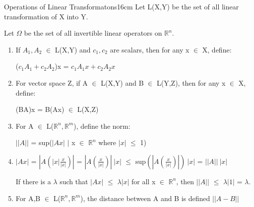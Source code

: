     \begin{definition}{Operations of Linear Transformatons}{16cm}
        Let L(X,Y) be the set of all linear transformation
        of X into Y.

        Let $\Omega$ be the set of all invertible linear operators
        on $\mathbb{R}^n$.

        \begin{enumerate}[label=(\alph*), leftmargin=0.2cm, itemsep=0.1cm]
            \item If $A_1,A_2$ $\in$ L(X,Y) and $c_1,c_2$ are scalars,
                then for any x $\in$ X, define:

                \hspace{0.5cm}
                ($c_1A_1 + c_2A_2$)x = $c_1A_1x + c_2A_2x$

            \item For vector space Z, if A $\in$ L(X,Y) and B $\in$ L(Y,Z),
                then for any x $\in$ X, define:

                \hspace{0.5cm}
                (BA)x = B(Ax) $\in$ L(X,Z)

            \item For A $\in$ L($\mathbb{R}^n,\mathbb{R}^m$),
                define the norm:
                
                \hspace{0.5cm}
                $||A||$ = sup($|Ax|$ {\color{lblue} $|$}
                                x $\in$ $\mathbb{R}^n$ where $|x|$ $\leq$ 1)

            \item $|Ax|$
                = $|A(|x|\frac{x}{|x|})|$
                = $|A(\frac{x}{|x|})| \ |x|$
                $\leq$ $\text{sup}(|A(\frac{x}{|x|})|) \ |x|$
                = $||A|| \ |x|$

                If there is a $\lambda$ such that $|Ax|$ $\leq$ $\lambda|x|$
                for all x $\in$ $\mathbb{R}^n$, then
                $||A||$ $\leq$ $\lambda|1|$ = $\lambda$.

            \item For A,B $\in$ L($\mathbb{R}^n,\mathbb{R}^m$),
                the distance between A and B is defined $||A-B||$
        \end{enumerate}
    \end{definition}

    \newpage



